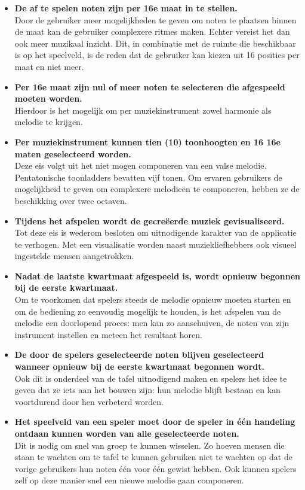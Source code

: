 \documentclass{acm}
\begin{document}
\begin{itemize}
	\item \textbf{De af te spelen noten zijn per 16e maat in te stellen.} \\ Door de gebruiker meer mogelijkheden te geven om noten te plaatsen binnen de maat kan de gebruiker complexere ritmes maken. Echter vereist het dan ook meer muzikaal inzicht. Dit, in combinatie met de ruimte die beschikbaar is op het speelveld, is de reden dat de gebruiker kan kiezen uit 16 posities per maat en niet meer.
	
	\item \textbf{Per 16e maat zijn nul of meer noten te selecteren die afgespeeld moeten worden.} \\ Hierdoor is het mogelijk om per muziekinstrument zowel harmonie als melodie te krijgen.
	
	\item \textbf{Per muziekinstrument kunnen tien (10) toonhoogten en 16 16e maten geselecteerd worden.} \\ Deze eis volgt uit het niet mogen componeren van een valse melodie. Pentatonische toonladders bevatten vijf tonen. Om ervaren gebruikers de mogelijkheid te geven om complexere melodie\"en te componeren, hebben ze de beschikking over twee octaven.
	
	\item \textbf{Tijdens het afspelen wordt de gecre\"eerde muziek gevisualiseerd.} \\ Tot deze eis is wederom besloten om uitnodigende karakter van de applicatie te verhogen. Met een visualisatie worden naast muziekliefhebbers ook visueel ingestelde mensen aangetrokken.
	
	\item \textbf{Nadat de laatste kwartmaat afgespeeld is, wordt opnieuw begonnen bij de eerste kwartmaat.} \\ Om te voorkomen dat spelers steeds de melodie opnieuw moeten starten en om de bediening zo eenvoudig mogelijk te houden, is het afspelen van de melodie een doorlopend proces: men kan zo aanschuiven, de noten van zijn instrument instellen en meteen het resultaat horen.
	
	\item \textbf{De door de spelers geselecteerde noten blijven geselecteerd wanneer opnieuw bij de eerste kwartmaat begonnen wordt.} \\ Ook dit is onderdeel van de tafel uitnodigend maken en spelers het idee te geven dat ze iets aan het bouwen zijn: hun melodie blijft bestaan en kan voortdurend door hen verbeterd worden.
	
	\item \textbf{Het speelveld van een speler moet door de speler in \'e\'en handeling ontdaan kunnen worden van alle geselecteerde noten.} \\ Dit is nodig om snel van groep te kunnen wisselen. Zo hoeven mensen die staan te wachten om te tafel te kunnen gebruiken niet te wachten op dat de vorige gebruikers hun noten \'e\'en voor \'e\'en gewist hebben. Ook kunnen spelers zelf op deze manier snel een nieuwe melodie gaan componeren.
\end{itemize}
\end{document}
